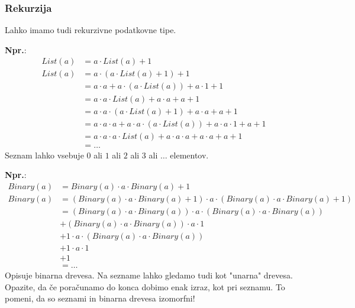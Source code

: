 \documentclass{report}
\newcommand{\Ex}{\textbf{Npr.}:\ }
\newcommand{\Seq}{\cdot}
\newcommand{\Sum}{\mathrel{+}}
\newcommand{\Var}[1]{{#1}}
\begin{document}
\subsubsection*{Rekurzija}
Lahko imamo tudi rekurzivne podatkovne tipe.

\Ex
\begin{equation*}
  \begin{aligned}
    List(\Var{a}) &= \Var{a} \Seq List(\Var{a}) \Sum 1\\[1em]
    List(\Var{a}) &= \Var{a} \Seq (\Var{a} \Seq List(\Var{a}) \Sum 1) \Sum 1\\
         &= \Var{a} \Seq \Var{a} \Sum \Var{a} \Seq (\Var{a} \Seq List(\Var{a})) \Sum \Var{a} \Seq 1 \Sum 1\\
         &= \Var{a} \Seq \Var{a} \Seq List(\Var{a}) \Sum \Var{a} \Seq \Var{a} \Sum \Var{a} \Sum 1\\
         &= \Var{a} \Seq \Var{a} \Seq (\Var{a} \Seq List(\Var{a}) \Sum 1) \Sum \Var{a} \Seq \Var{a} \Sum \Var{a} \Sum 1\\
         &= \Var{a} \Seq \Var{a} \Seq \Var{a} \Sum \Var{a} \Seq \Var{a} \Seq (\Var{a} \Seq List(\Var{a})) \Sum \Var{a} \Seq \Var{a} \Seq 1 \Sum \Var{a} \Sum 1\\
         &= \Var{a} \Seq \Var{a} \Seq \Var{a} \Seq List(\Var{a}) \Sum \Var{a} \Seq \Var{a} \Seq \Var{a} \Sum \Var{a} \Seq \Var{a} \Sum \Var{a} \Sum 1\\
         &= \dots
  \end{aligned}
\end{equation*}
Seznam lahko vsebuje $0$ ali $1$ ali $2$ ali $3$ ali $\dots$ elementov.

\Ex
\begin{equation*}
  \begin{aligned}
    Binary(\Var{a}) &= Binary(\Var{a}) \Seq \Var{a} \Seq Binary(\Var{a}) \Sum 1\\[1em]
    Binary(\Var{a}) &= (Binary(\Var{a}) \Seq \Var{a} \Seq Binary(\Var{a}) \Sum 1) \Seq \Var{a} \Seq (Binary(\Var{a}) \Seq \Var{a} \Seq Binary(\Var{a}) \Sum 1)\\
           &= (Binary(\Var{a}) \Seq \Var{a} \Seq Binary(\Var{a})) \Seq \Var{a} \Seq (Binary(\Var{a}) \Seq \Var{a} \Seq Binary(\Var{a}))\\ 
           &\Sum (Binary(\Var{a}) \Seq \Var{a} \Seq Binary(\Var{a})) \Seq \Var{a} \Seq 1\\
           &\Sum 1 \Seq \Var{a} \Seq (Binary(\Var{a}) \Seq \Var{a} \Seq Binary(\Var{a}))\\
           &\Sum 1 \Seq \Var{a} \Seq 1\\
           &\Sum 1\\
           &= \dots
  \end{aligned}
\end{equation*}
Opisuje binarna drevesa.
Na sezname lahko gledamo tudi kot "unarna" drevesa.
Opazite, da če poračunamo do konca dobimo enak izraz, kot pri seznamu.
To pomeni, da so seznami in binarna drevesa izomorfni!
\end{document}
